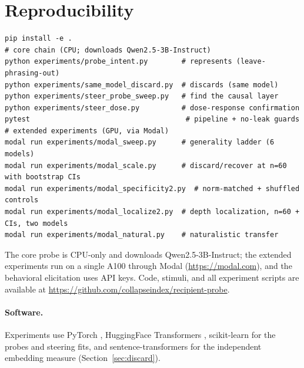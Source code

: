 \documentclass[11pt]{article}
\begin{document}
\section{Reproducibility}
\label{app:repro}
\begin{tcolorbox}[graybox, breakable, title={Reproduce}]
\begin{verbatim}
pip install -e .
# core chain (CPU; downloads Qwen2.5-3B-Instruct)
python experiments/probe_intent.py        # represents (leave-phrasing-out)
python experiments/same_model_discard.py  # discards (same model)
python experiments/steer_probe_sweep.py   # find the causal layer
python experiments/steer_dose.py          # dose-response confirmation
pytest                                     # pipeline + no-leak guards
# extended experiments (GPU, via Modal)
modal run experiments/modal_sweep.py      # generality ladder (6 models)
modal run experiments/modal_scale.py      # discard/recover at n=60 with bootstrap CIs
modal run experiments/modal_specificity2.py  # norm-matched + shuffled controls
modal run experiments/modal_localize2.py  # depth localization, n=60 + CIs, two models
modal run experiments/modal_natural.py    # naturalistic transfer
\end{verbatim}
\end{tcolorbox}
The core probe is CPU-only and downloads Qwen2.5-3B-Instruct; the extended experiments run on a single
A100 through Modal (\url{https://modal.com}), and the behavioral elicitation uses API keys. Code, stimuli, and
all experiment scripts are available at \url{https://github.com/collapseindex/recipient-probe}.

\paragraph{Software.} Experiments use PyTorch \citep{paszke2019pytorch}, HuggingFace Transformers
\citep{wolf2020transformers}, scikit-learn \citep{pedregosa2011sklearn} for the probes and steering fits, and
sentence-transformers \citep{reimers2019sbert} for the independent embedding measure (Section~\ref{sec:discard}).
\end{document}
